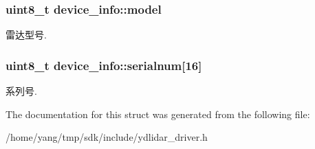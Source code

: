 \subsubsection[{\texorpdfstring{model}{model}}]{\setlength{\rightskip}{0pt plus 5cm}uint8\+\_\+t device\+\_\+info\+::model}\hypertarget{structdevice__info_a3c491b342ed11af3c70358e7e8f6c935}{}\label{structdevice__info_a3c491b342ed11af3c70358e7e8f6c935}
雷达型号. 
\subsubsection[{\texorpdfstring{serialnum}{serialnum}}]{\setlength{\rightskip}{0pt plus 5cm}uint8\+\_\+t device\+\_\+info\+::serialnum\mbox{[}16\mbox{]}}\hypertarget{structdevice__info_abf23e35480aff36d846085ca6fd0eec3}{}\label{structdevice__info_abf23e35480aff36d846085ca6fd0eec3}
系列号. 

The documentation for this struct was generated from the following file\+:\begin{DoxyCompactItemize}
\item 
/home/yang/tmp/sdk/include/ydlidar\+\_\+driver.\+h\end{DoxyCompactItemize}
